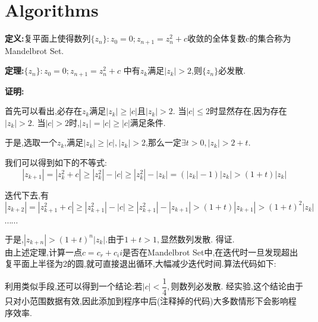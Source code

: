 \section{Algorithms}
\label{sec:algorithms}

{\bf 定义:}复平面上使得数列$ \{z_n\}: z_0 = 0; z_{n+1} = z_n^2 + c$收敛的全体复数c的集合称为Mandelbrot Set.

{\bf 定理:}$ \{z_n\}: z_0 = 0; z_{n+1} = z_n^2 + c $ 中有$ z_k $满足$ |z_k| > 2$,则$ \{ z_n\}$必发散.

{\bf 证明:}

首先可以看出,必存在$ z_k$满足$ |z_k| \ge |c|$且$ |z_k| > 2$. 当$ |c| \le 2$时显然存在,因为存在$ |z_k| > 2$.
当$ |c| > 2$时,$ |z_1| = |c| \ge |c|$满足条件.

于是,选取一个$ z_k$,满足$ |z_k| \ge |c|, |z_k| > 2$,那么一定$ \exists t > 0, |z_k| > 2 + t.$

我们可以得到如下的不等式:
\[ |z_{k+1}| = |z_k^2 + c| \ge |z_k^2| - |c| \ge |z_k^2| - |z_k| = (|z_k| - 1)|z_k| > (1 + t)|z_k| \]

迭代下去,有
\[ |z_{k+2}| = |z_{k+1}^2 + c| \ge |z_{k+1}^2| - |c| \ge |z_{k+1}^2| - |z_{k+1}| > (1+t)|z_{k+1}| > (1+t)^2|z_k|\]

$ \cdots \cdots$

于是,$ |z_{k+n}| > (1+t)^n|z_k|.$由于$ 1 + t > 1, $显然数列发散. 得证.
\\

由上述定理,计算一点$ c = c_r + c_ii$是否在Mandelbrot Set中,在迭代时一旦发现超出复平面上半径为2的圆,就可直接退出循环,大幅减少迭代时间.算法代码如下:

利用类似手段,还可以得到一个结论:若$ |c| < \dfrac{1}{4}, $则数列必发散.
经实验,这个结论由于只对小范围数据有效,因此添加到程序中后(注释掉的代码)大多数情形下会影响程序效率.
